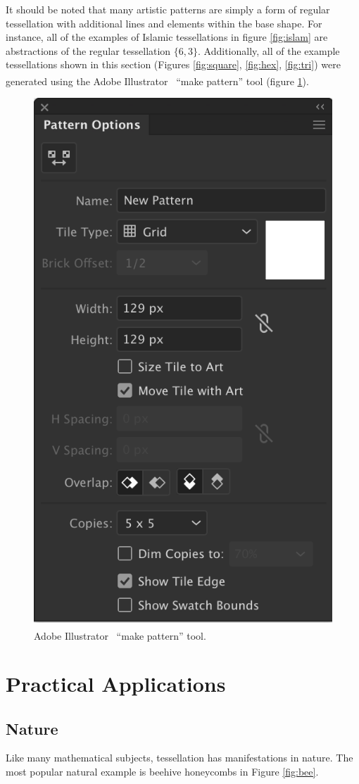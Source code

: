 \documentclass[12pt,letterpaper]{article}
\begin{document}
It should be noted that many artistic patterns are simply a form of regular tessellation with additional lines and elements within the base shape. For instance, all of the examples of Islamic tessellations in figure \ref{fig:islam} are abstractions of the regular tessellation $\{6,3\}$. Additionally, all of the example tessellations shown in this section (Figures \ref{fig:square}, \ref{fig:hex}, \ref{fig:tri}) were generated using the Adobe Illustrator\textsuperscript{\textregistered} \, ``make pattern'' tool (figure \ref{fig:adobe}).

\begin{figure}[H]
    \begin{center}
        \includegraphics[width=.4\linewidth]{ai-tool}
        \caption{Adobe Illustrator\textsuperscript{\textregistered} \, ``make pattern'' tool.}
        \label{fig:adobe}
    \end{center}
\end{figure}

\section{Practical Applications}

\subsection{Nature}
Like many mathematical subjects, tessellation has manifestations in nature. The most popular natural example is beehive honeycombs in Figure \ref{fig:bee}.
\end{document}
